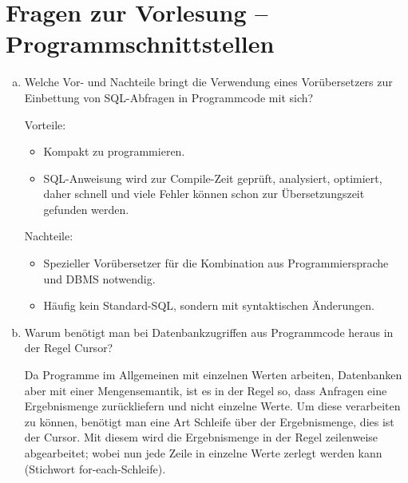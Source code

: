 \section{Fragen zur Vorlesung -- Programmschnittstellen}

\begin{enumerate}[a)]
	\item Welche Vor- und Nachteile bringt die Verwendung eines Vorübersetzers zur Einbettung von SQL-Abfragen in Programmcode mit sich?

	\begin{solution}
	Vorteile:
	\begin{itemize}
		\item Kompakt zu programmieren.
		\item SQL-Anweisung wird zur Compile-Zeit geprüft, analysiert, optimiert, daher schnell und viele Fehler können schon zur Übersetzungszeit gefunden werden.
	\end{itemize}
	Nachteile:
	\begin{itemize}
		\item Spezieller Vorübersetzer für die Kombination aus Programmiersprache und DBMS notwendig.
		\item Häufig kein Standard-SQL, sondern mit syntaktischen Änderungen.
	\end{itemize}
	\end{solution}

	\begin{note}
	\begin{center}
	\end{center}
	\end{note}

	\item Warum benötigt man bei Datenbankzugriffen aus Programmcode heraus in der Regel Cursor?

	\begin{solution}
	Da Programme im Allgemeinen mit einzelnen Werten arbeiten, Datenbanken aber mit einer Mengensemantik, ist es in der Regel so, dass Anfragen eine Ergebnismenge zurückliefern und nicht einzelne Werte.
	Um diese verarbeiten zu können, benötigt man eine Art Schleife über der Ergebnismenge, dies ist der Cursor. Mit diesem wird die Ergebnismenge in der Regel zeilenweise abgearbeitet; wobei nun jede Zeile in einzelne Werte zerlegt werden kann (Stichwort for-each-Schleife).
	\end{solution}

\end{enumerate}
